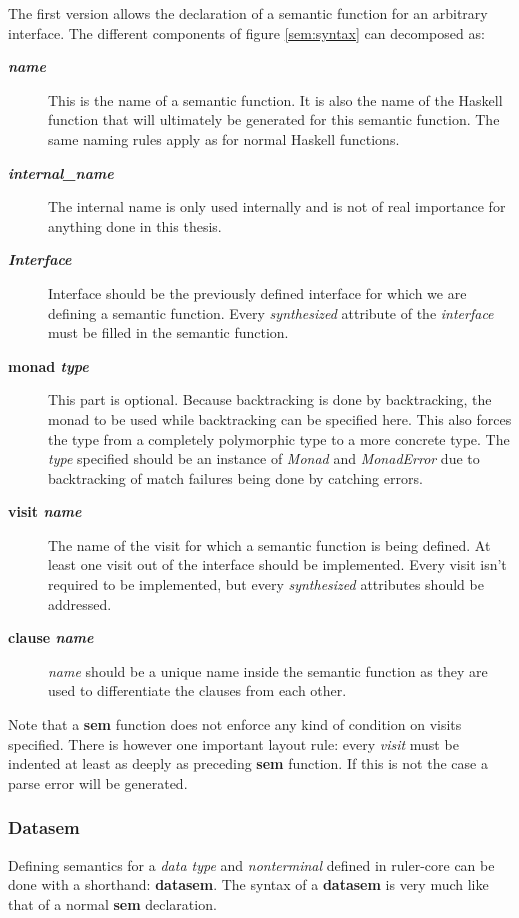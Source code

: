 The first version allows the declaration of a semantic function for an arbitrary interface. The different components of figure \ref{sem:syntax} can decomposed as:

\begin{description}
\item[\textbf{\textit{name}}] This is the name of a semantic function. It is also the name of the Haskell function that will ultimately be generated for this semantic function. The same naming rules apply as for normal Haskell functions.
\item[\textbf{\textit{internal\_name}}] The internal name is only used internally and is not of real importance for anything done in this thesis.
\item[\textbf{\textit{Interface}}] Interface should be the previously defined interface for which we are defining a semantic function. Every \emph{synthesized} attribute of the \emph{interface} must be filled in the semantic function.
\item[\textbf{monad \textit{type}}] { This part is optional. Because backtracking is done by backtracking, the monad to be used while backtracking can be specified here. This also forces the type from a completely polymorphic type to a more concrete type. The \textit{type} specified should be an instance of \emph{Monad} and \emph{MonadError} due to backtracking of match failures being done by catching errors.}
\item[\textbf{visit \textit{name}}] The name of the visit for which a semantic function is being defined. At least one visit out of the interface should be implemented. Every visit isn't required to be implemented, but every \emph{synthesized} attributes should be addressed.
\item[\textbf{clause \textit{name}}] \textit{name} should be a unique name inside the semantic function as they are used to differentiate the clauses from each other.
\end{description}

Note that a \textbf{sem} function does not enforce any kind of condition on visits specified. There is however one important layout rule: every \emph{visit} must be indented at least as deeply as preceding \textbf{sem} function. If this is not the case a parse error will be generated.
\subsubsection{Datasem}
Defining semantics for a \emph{data type} and \emph{nonterminal} defined in ruler-core can be done with a shorthand: \textbf{datasem}. The syntax of a \textbf{datasem} is very much like that of a normal \textbf{sem} declaration.

